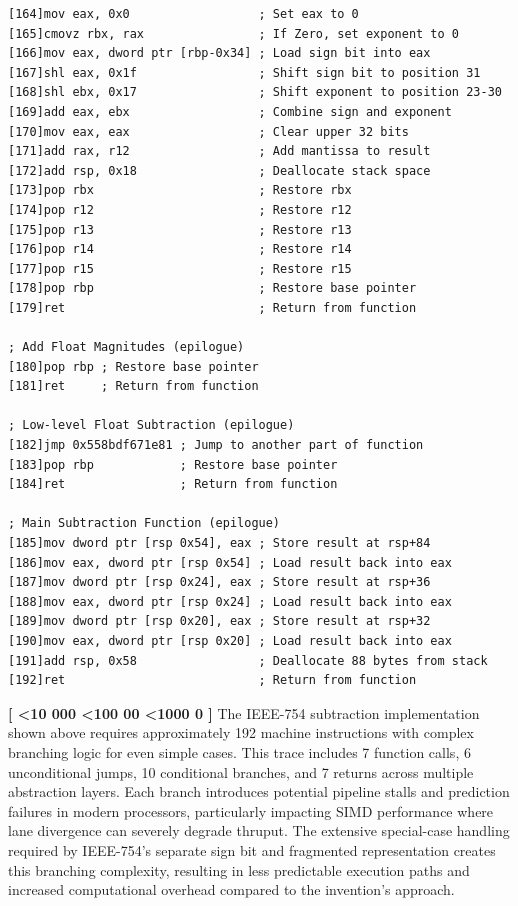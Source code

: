 \documentclass[12pt,letter]{article}
\newcounter{paracounter}
\newcommand{\ppara}[1]{
\noindent\textbf{[\formatparanumber{\arabic{paracounter}}]} \begingroup\RaggedRight\sloppy\hbadness=10000 #1\par\endgroup%
\stepcounter{paracounter}%
}
\newcommand{\formatparanumber}[1]{%
\ifnum#1<10 000%
\else\ifnum#1<100 00%
\else\ifnum#1<1000 0%
\fi\fi\fi#1%
}
\begin{document}
\begin{lstlisting}[style=rust, caption={Annotated Binary32 Normal Case Subtraction Instruction Trace}, label={fig:ieee_subtract}]
[164]mov eax, 0x0                  ; Set eax to 0
[165]cmovz rbx, rax                ; If Zero, set exponent to 0
[166]mov eax, dword ptr [rbp-0x34] ; Load sign bit into eax
[167]shl eax, 0x1f                 ; Shift sign bit to position 31
[168]shl ebx, 0x17                 ; Shift exponent to position 23-30
[169]add eax, ebx                  ; Combine sign and exponent
[170]mov eax, eax                  ; Clear upper 32 bits
[171]add rax, r12                  ; Add mantissa to result
[172]add rsp, 0x18                 ; Deallocate stack space
[173]pop rbx                       ; Restore rbx
[174]pop r12                       ; Restore r12
[175]pop r13                       ; Restore r13
[176]pop r14                       ; Restore r14
[177]pop r15                       ; Restore r15
[178]pop rbp                       ; Restore base pointer
[179]ret                           ; Return from function

; Add Float Magnitudes (epilogue)
[180]pop rbp ; Restore base pointer
[181]ret     ; Return from function

; Low-level Float Subtraction (epilogue)
[182]jmp 0x558bdf671e81 ; Jump to another part of function
[183]pop rbp            ; Restore base pointer
[184]ret                ; Return from function

; Main Subtraction Function (epilogue)
[185]mov dword ptr [rsp 0x54], eax ; Store result at rsp+84
[186]mov eax, dword ptr [rsp 0x54] ; Load result back into eax
[187]mov dword ptr [rsp 0x24], eax ; Store result at rsp+36
[188]mov eax, dword ptr [rsp 0x24] ; Load result back into eax
[189]mov dword ptr [rsp 0x20], eax ; Store result at rsp+32
[190]mov eax, dword ptr [rsp 0x20] ; Load result back into eax
[191]add rsp, 0x58                 ; Deallocate 88 bytes from stack
[192]ret                           ; Return from function

\end{lstlisting}

\ppara{The IEEE-754 subtraction implementation shown above requires approximately 192 machine instructions with complex branching logic for even simple cases. This trace includes 7 function calls, 6 unconditional jumps, 10 conditional branches, and 7 returns across multiple abstraction layers. Each branch introduces potential pipeline stalls and prediction failures in modern processors, particularly impacting SIMD performance where lane divergence can severely degrade thruput. The extensive special-case handling required by IEEE-754's separate sign bit and fragmented representation creates this branching complexity, resulting in less predictable execution paths and increased computational overhead compared to the invention's approach.}
\end{document}
